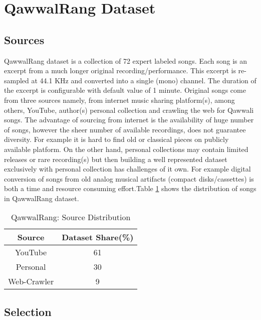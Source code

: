 \documentclass{article}
\begin{document}
\section{QawwalRang Dataset}\label{sec:data}

\subsection{Sources}

QawwalRang dataset is a collection of 72 expert labeled songs. Each song is an excerpt from a much longer original recording/performance. This excerpt is re-sampled at 44.1 KHz and converted into a single (mono) channel. The duration of the excerpt is configurable with default value of 1 minute. Original songs come from three sources namely, from internet music sharing platform(s), among others, YouTube, author(s) personal collection and crawling the web for Qawwali songs. The advantage of sourcing from internet is the availability of huge number of songs, however the sheer number of available recordings, does not guarantee diversity.  For example it is hard to find old or classical pieces on publicly available platform. On the other hand, personal collections may contain limited releases or rare recording(s) but then building a well represented dataset exclusively with personal collection has challenges of it own. For example digital conversion of songs from old analog musical artifacts (compact disks/cassettes) is both a time and resource consuming effort.Table 
\ref{tab:sources} shows the distribution of songs in QawwalRang dataset.
\begin{table}[htpb]
\centering
  \begin{tabular}{|c | c|}
  \toprule
  \bfseries Source & \bfseries Dataset Share(\%) \\
  \hline \hline
  YouTube  & 61 \\
  \hline
  Personal & 30 \\
  \hline
  Web-Crawler & 9  \\
  \bottomrule
  \end{tabular}
  \caption{QawwalRang: Source Distribution}
\label{tab:sources}
\end{table}
\subsection{Selection}
\end{document}
